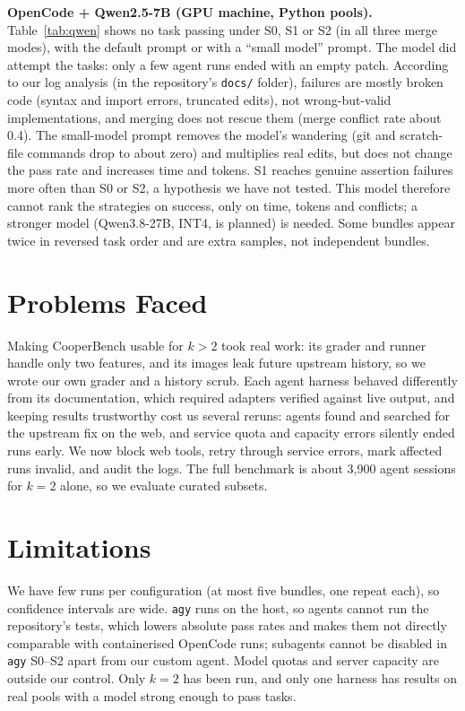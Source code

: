 \documentclass[sigconf,nonacm]{acmart}
\begin{document}
\begin{table}[t]
\caption{OpenCode + Qwen2.5-7B-Instruct on the \texttt{core} Python pools ($k{=}2$, GPU machine; some planned runs had not finished). $n$ = number of runs. Wall and tokens are medians per run.}
\label{tab:qwen}
\small

\end{table}

\textbf{OpenCode + Qwen2.5-7B (GPU machine, Python pools).} Table~\ref{tab:qwen} shows no task passing under S0, S1 or S2 (in all three merge modes), with the default prompt or with a ``small model'' prompt. The model did attempt the tasks: only a few agent runs ended with an empty patch. According to our log analysis (in the repository's \texttt{docs/} folder), failures are mostly broken code (syntax and import errors, truncated edits), not wrong-but-valid implementations, and merging does not rescue them (merge conflict rate about 0.4). The small-model prompt removes the model's wandering (git and scratch-file commands drop to about zero) and multiplies real edits, but does not change the pass rate and increases time and tokens. S1 reaches genuine assertion failures more often than S0 or S2, a hypothesis we have not tested. This model therefore cannot rank the strategies on success, only on time, tokens and conflicts; a stronger model (Qwen3.8-27B, INT4, is planned) is needed. Some bundles appear twice in reversed task order and are extra samples, not independent bundles.

\section{Problems Faced}
Making CooperBench usable for $k>2$ took real work: its grader and runner handle only two features, and its images leak future upstream history, so we wrote our own grader and a history scrub. Each agent harness behaved differently from its documentation, which required adapters verified against live output, and keeping results trustworthy cost us several reruns: agents found and searched for the upstream fix on the web, and service quota and capacity errors silently ended runs early. We now block web tools, retry through service errors, mark affected runs invalid, and audit the logs. The full benchmark is about 3,900 agent sessions for $k{=}2$ alone, so we evaluate curated subsets.

\section{Limitations}
We have few runs per configuration (at most five bundles, one repeat each), so confidence intervals are wide. \texttt{agy} runs on the host, so agents cannot run the repository's tests, which lowers absolute pass rates and makes them not directly comparable with containerised OpenCode runs; subagents cannot be disabled in \texttt{agy} S0--S2 apart from our custom agent. Model quotas and server capacity are outside our control. Only $k{=}2$ has been run, and only one harness has results on real pools with a model strong enough to pass tasks.
\end{document}
